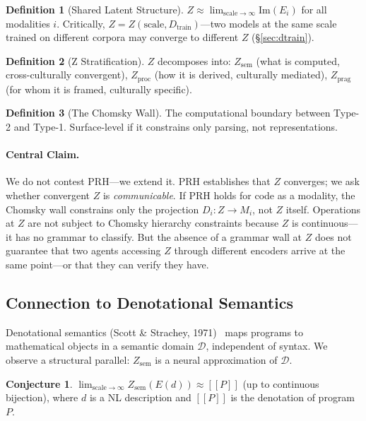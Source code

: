 \documentclass[11pt]{article}
\theoremstyle{definition}
\newtheorem{definition}{Definition}[section]
\newtheorem{conjecture}{Conjecture}[section]
\newcommand{\Zsem}{Z_{\text{sem}}}
\newcommand{\Zproc}{Z_{\text{proc}}}
\newcommand{\Zprag}{Z_{\text{prag}}}
\newcommand{\Dtrain}{D_{\text{train}}}
\begin{document}
\begin{definition}[Shared Latent Structure]\label{def:Z}
$Z \approx \lim_{\text{scale}\to\infty} \mathrm{Im}(E_i)$ for all modalities $i$. Critically, $Z = Z(\text{scale}, \Dtrain)$---two models at the same scale trained on different corpora may converge to different $Z$ (\S\ref{sec:dtrain}).
\end{definition}

\begin{definition}[Z Stratification]\label{def:stratification}
$Z$ decomposes into: $\Zsem$ (what is computed, cross-culturally convergent), $\Zproc$ (how it is derived, culturally mediated), $\Zprag$ (for whom it is framed, culturally specific).
\end{definition}

\begin{definition}[The Chomsky Wall]\label{def:wall}
The computational boundary between Type-2 and Type-1. Surface-level if it constrains only parsing, not representations.
\end{definition}

\paragraph{Central Claim.}
We do not contest PRH---we extend it. PRH establishes that $Z$ converges; we ask whether convergent $Z$ is \emph{communicable}. If PRH holds for code as a modality, the Chomsky wall constrains only the projection $D_i : Z \to M_i$, not $Z$ itself. Operations at $Z$ are not subject to Chomsky hierarchy constraints because $Z$ is continuous---it has no grammar to classify. But the absence of a grammar wall at $Z$ does not guarantee that two agents accessing $Z$ through different encoders arrive at the same point---or that they can verify they have.

\subsection{Connection to Denotational Semantics}

Denotational semantics (Scott \& Strachey, 1971)~\cite{scott1971semantics} maps programs to mathematical objects in a semantic domain $\mathcal{D}$, independent of syntax. We observe a structural parallel: $\Zsem$ is a neural approximation of $\mathcal{D}$.

\begin{conjecture}\label{conj:denotational}
$\lim_{\text{scale}\to\infty} \Zsem(E(d)) \approx [\![ P ]\!]$ (up to continuous bijection), where $d$ is a NL description and $[\![ P ]\!]$ is the denotation of program $P$.
\end{conjecture}
\end{document}
